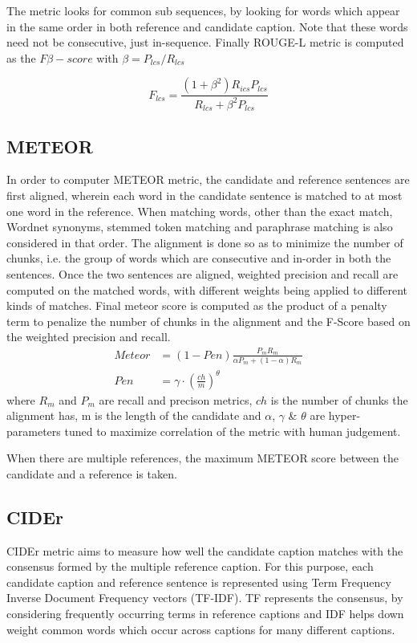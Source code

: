 The metric looks for common sub sequences, by looking for words which appear in the
same order in both reference and candidate caption.
Note that these words need not be consecutive, just in-sequence.
Finally ROUGE-L metric is computed as the $F\beta-score$ with $\beta =
P_{lcs}/R_{lcs}$

\begin{equation}
        F_{lcs} = \frac{(1+\beta^2)R_{ics}P_{lcs}}{R_{lcs}+ \beta^2 P_{lcs}}
\end{equation}

\subsection*{METEOR}
In order to computer METEOR metric, the candidate and reference sentences are
first aligned, wherein each word in the candidate sentence is matched to
at most one word in the reference.
When matching words, other than the exact match, Wordnet synonyms, stemmed token
matching and paraphrase matching is also considered in that order.
The alignment is done so as to minimize the number of chunks, i.e. the group of
words which are consecutive and in-order in both the sentences.
Once the two sentences are aligned, weighted precision and recall are computed
on the matched words, with different weights being applied to different kinds of
matches.
Final meteor score is computed as the product of a penalty term to penalize the
number of chunks in the alignment and the F-Score based on the weighted
precision and recall.
\begin{align}
        Meteor &= (1-Pen)\frac{P_m R_m}{\alpha{}P_m+(1-\alpha)R_m}\\[0.75ex]
        Pen &= \gamma\cdot\left(\frac{ch}{m}\right)^\theta
\end{align}
\noindent where $R_m$ and $P_m$ are recall and precison metrics, $ch$ is the
number of chunks the alignment has, m is the length of the candidate and
$\alpha$, $\gamma$ \& $\theta$ are hyper-parameters tuned to maximize
correlation of the metric with human judgement.

When there are multiple references, the maximum METEOR score between the
candidate and a reference is taken.

\subsection*{CIDEr}
CIDEr metric aims to measure how well the candidate caption matches with the
consensus formed by the multiple reference caption.
For this purpose, each candidate caption and reference sentence is represented
using Term Frequency Inverse Document Frequency vectors (TF-IDF).
TF represents the consensus, by considering frequently occurring terms in
reference captions and IDF helps down weight common words which occur across
captions for many different captions.

